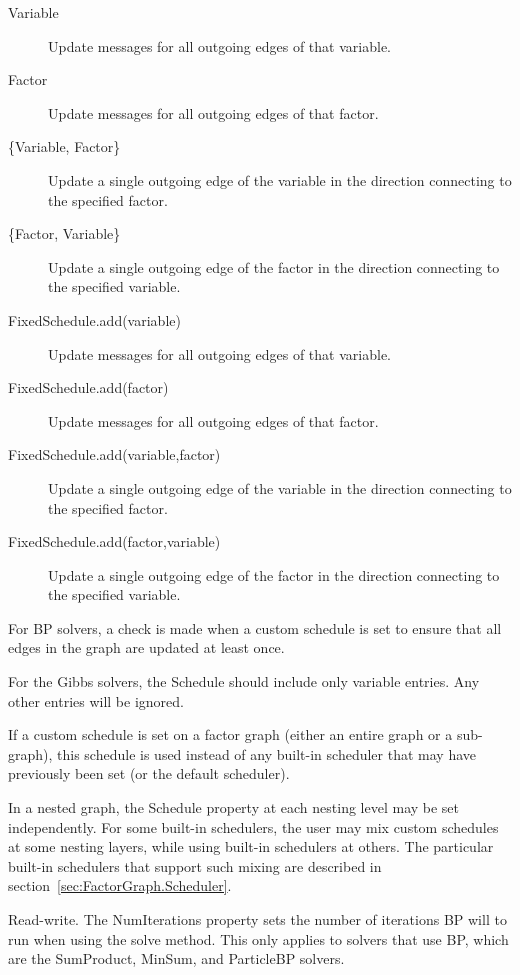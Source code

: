 \ifmatlab
\begin{description}
\item[Variable] Update messages for all outgoing edges of that variable.
\item[Factor] Update messages for all outgoing edges of that factor.
\item[\{Variable, Factor\}] Update a single outgoing edge of the variable in the direction connecting to the specified factor.
\item[\{Factor, Variable\}] Update a single outgoing edge of the factor in the direction connecting to the specified variable.
\end{description}
\fi

\ifjava
\begin{description}
\item[FixedSchedule.add(variable)] Update messages for all outgoing edges of that variable.
\item[FixedSchedule.add(factor)] Update messages for all outgoing edges of that factor.
\item[FixedSchedule.add(variable,factor)] Update a single outgoing edge of the variable in the direction connecting to the specified factor.
\item[FixedSchedule.add(factor,variable)] Update a single outgoing edge of the factor in the direction connecting to the specified variable.
\end{description}
\fi

For BP solvers, a check is made when a custom schedule is set to ensure that all edges in the graph are updated at least once.

For the Gibbs solvers, the Schedule should include only variable entries.  Any other entries will be ignored.

If a custom schedule is set on a factor graph (either an entire graph or a sub-graph), this schedule is used instead of any built-in scheduler that may have previously been set (or the default scheduler).

In a nested graph, the Schedule property at each nesting level may be set independently.  For some built-in schedulers, the user may mix custom schedules at some nesting layers, while using built-in schedulers at others.  The particular built-in schedulers that support such mixing are described in section~\ref{sec:FactorGraph.Scheduler}.



Read-write.  The NumIterations property sets the number of iterations BP will to run when using the solve method.  This only applies to solvers that use BP, which are the SumProduct, MinSum, and ParticleBP solvers.


